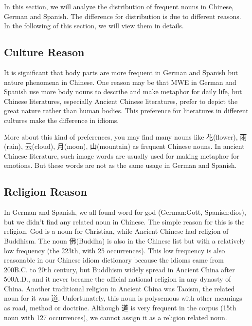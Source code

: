 In this section, we will analyze the distribution of frequent nouns in Chinese, German and Spanish. The difference for distribution is due to different reasons. In the following of this section, we will view them in details. 

\subsection{Culture Reason}
It is significant that body parts are more frequent in German and Spanish but nature phenomena in Chinese. One reason may be that MWE in German and Spanish use more body nouns to describe and make metaphor for daily life, but Chinese literatures, especially Ancient Chinese literatures, prefer to depict the great nature rather than human bodies. This preference for literatures in different cultures make the difference in idioms. 

More about this kind of preferences, you may find many nouns like 花(flower), 雨(rain), 云(cloud), 月(moon), 山(mountain) as frequent Chinese nouns. In ancient Chinese literature, such image words are usually used for making metaphor for emotions. But these words are not as the same usage in German and Spanish. 

\subsection{Religion Reason}
In German and Spanish, we all found word for god (German:Gott, Spanish:dios), but we didn't find any related noun in Chinese. The simple reason for this is the religion. God is a noun for Christian, while Ancient Chinese had religion of Buddhism. The noun 佛(Buddha) is also in the Chinese list but with a relatively low frequency (the 223th, with 25 occurrences). This low frequency is also reasonable in our Chinese idiom dictionary because the idioms came from 200B.C. to 20th century, but Buddhism widely spread in Ancient China after 500A.D., and it never became the official national religion in any dynasty of China. Another traditional religion in Ancient China was Taoism, the related noun for it was 道. Unfortunately, this noun is polysemous with other meanings as road, method or doctrine. Although 道 is very frequent in the corpus (15th noun with 127 occurrences), we cannot assign it as a religion related noun. 

